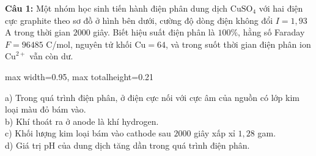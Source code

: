 \documentclass[12pt,a4paper]{article}
\begin{document}
\par\noindent\begin{minipage}{\linewidth}
\noindent \textbf{Câu 1:} Một nhóm học sinh tiến hành điện phân dung dịch $\text{CuSO}_4$ với hai điện cực graphite theo sơ đồ ở hình bên dưới, cường độ dòng điện không đổi $I = 1{,}93$ A trong thời gian $2000$ giây. Biết hiệu suất điện phân là $100\%$, hằng số Faraday $F = 96485$ C/mol, nguyên tử khối $\text{Cu} = 64$, và trong suốt thời gian điện phân ion $\text{Cu}^{2+}$ vẫn còn dư.\\
\begin{center}
\begin{adjustbox}{max width=0.95\linewidth, max totalheight=0.21\textheight}
\end{adjustbox}
\end{center}
\noindent a) Trong quá trình điện phân, ở điện cực nối với cực âm của nguồn có lớp kim loại màu đỏ bám vào.\\

\noindent b) Khí thoát ra ở anode là khí hydrogen.\\

\noindent c) Khối lượng kim loại bám vào cathode sau $2000$ giây xấp xỉ $1{,}28$ gam.\\

\noindent d) Giá trị pH của dung dịch tăng dần trong quá trình điện phân.\\
\end{minipage}\par\vspace{0.12cm}
\end{document}
